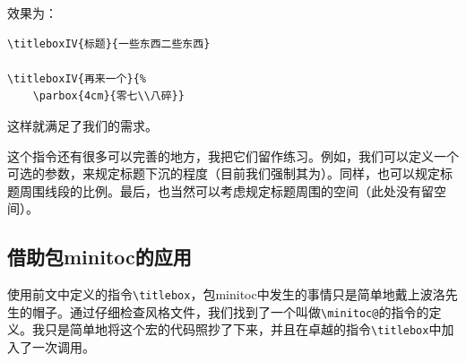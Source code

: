 效果为：

\begin{codelist}[10.22]{

}
\begin{verbatim}
\titleboxIV{标题}{一些东西二些东西}

\titleboxIV{再来一个}{%
    \parbox{4cm}{零七\\八碎}}\end{verbatim}
\end{codelist}

这样就满足了我们的需求。

\begin{ii}
这个指令还有很多可以完善的地方，我把它们留作练习。例如，我们可以定义一个可选的参数，来规定标题下沉的程度（目前我们强制其为\dm{-0.5ex}）。同样，也可以规定标题周围线段的比例。最后，也当然可以考虑规定标题周围的空间（此处没有留空间）。
\end{ii}

\subsection{借助包\textsf{minitoc}的应用}

使用前文中定义的指令\verb|\titlebox|，包\textsf{minitoc}中发生的事情只是简单地戴上波洛先生的帽子。通过仔细检查风格文件，我们找到了一个叫做\verb|\minitoc@|的指令的定义。我只是简单地将这个宏的代码照抄了下来，并且在卓越的指令\verb|\titlebox|中加入了一次调用。

